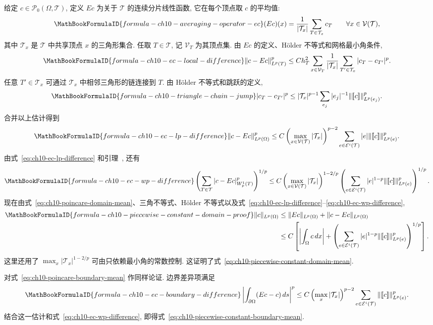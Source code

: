 \begin{Proof}
给定 $c\in\mathcal P_0(\Omega,\mathcal T)$, 定义 $Ec$ 为关于 $\mathcal T$ 的连续分片线性函数, 它在每个顶点取 $c$ 的平均值:
\[
\MathBookFormulaID{formula-ch10-averaging-operator-ec}
(Ec)(x)=\frac1{|\mathcal T_x|}\sum_{T\in\mathcal T_x}c_T
\qquad\forall x\in\mathcal V(\mathcal T),
\]
其中 $\mathcal T_x$ 是 $\mathcal T$ 中共享顶点 $x$ 的三角形集合. 任取 $T\in\mathcal T$, 记 $\mathcal V_T$ 为其顶点集. 由 $Ec$ 的定义、Hölder 不等式和网格最小角条件,
\[
\MathBookFormulaID{formula-ch10-ec-local-difference}
\|c-Ec\|_{L^p(T)}^p
\leq Ch_T^2\sum_{x\in\mathcal V_T}\frac1{|\mathcal T_x|}
\sum_{T'\in\mathcal T_x}|c_T-c_{T'}|^p.
\]
任意 $T'\in\mathcal T_x$ 可通过 $\mathcal T_x$ 中相邻三角形的链连接到 $T$. 由 Hölder 不等式和跳跃的定义,
\[
\MathBookFormulaID{formula-ch10-triangle-chain-jump}
|c_T-c_{T'}|^p\leq|\mathcal T_x|^{p-1}
\sum_{e_j}|e_j|^{-1}\|[\![c]\!]\|_{L^p(e_j)}^p.
\]
合并以上估计得到
\begin{equation}
\MathBookFormulaID{formula-ch10-ec-lp-difference}
\label{eq:ch10-ec-lp-difference}
\|c-Ec\|_{L^p(\Omega)}^p
\leq C\left(\max_{x\in\mathcal V(\mathcal T)}|\mathcal T_x|\right)^{p-2}
\sum_{e\in\mathcal E^i(\mathcal T)}|e|\|[\![c]\!]\|_{L^p(e)}^p.
\end{equation}
由式~\eqref{eq:ch10-ec-lp-difference} 和引理~, 还有
\begin{equation}
\MathBookFormulaID{formula-ch10-ec-wp-difference}
\label{eq:ch10-ec-wp-difference}
\left(\sum_{T\in\mathcal T}|c-Ec|_{W_p^1(T)}^p\right)^{1/p}
\leq C\left(\max_{x\in\mathcal V(\mathcal T)}|\mathcal T_x|\right)^{1-2/p}
\left(\sum_{e\in\mathcal E^i(\mathcal T)}|e|^{1-p}
\|[\![c]\!]\|_{L^p(e)}^p\right)^{1/p}.
\end{equation}
现在由式~\eqref{eq:ch10-poincare-domain-mean}、三角不等式、Hölder 不等式以及式~\eqref{eq:ch10-ec-lp-difference}--\eqref{eq:ch10-ec-wp-difference},
\begin{align*}
\MathBookFormulaID{formula-ch10-piecewise-constant-domain-proof}
\|c\|_{L^p(\Omega)}
&\leq\|Ec\|_{L^p(\Omega)}+\|c-Ec\|_{L^p(\Omega)}\\
&\leq C\left[\left|\int_\Omega c\,dx\right|
+\left(\sum_{e\in\mathcal E^i(\mathcal T)}|e|^{1-p}
\|[\![c]\!]\|_{L^p(e)}^p\right)^{1/p}\right].
\end{align*}
这里还用了 $\max_x|\mathcal T_x|^{1-2/p}$ 可由只依赖最小角的常数控制. 这证明了式~\eqref{eq:ch10-piecewise-constant-domain-mean}.

对式~\eqref{eq:ch10-poincare-boundary-mean} 作同样论证. 边界差异项满足
\[
\MathBookFormulaID{formula-ch10-ec-boundary-difference}
\left|\int_{\partial\Omega}(Ec-c)\,ds\right|^p
\leq C\left(\max_x|\mathcal T_x|\right)^{p-2}
\sum_{e\in\mathcal E^i(\mathcal T)}\|[\![c]\!]\|_{L^p(e)}^p.
\]
结合这一估计和式~\eqref{eq:ch10-ec-wp-difference}, 即得式~\eqref{eq:ch10-piecewise-constant-boundary-mean}.
\end{Proof}

